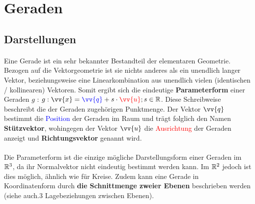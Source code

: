 \section{Geraden}

    \subsection{Darstellungen}

        \paragraph{} Eine Gerade ist ein sehr bekannter Bestandteil der elementaren Geometrie. Bezogen auf die Vektorgeometrie ist sie nichts anderes als ein
        unendlich langer Vektor, beziehungsweise eine Linearkombination aus unendlich vielen (identischen / kollinearen) Vektoren. Somit ergibt sich die
        eindeutige \textbf{Parameterform} einer Geraden $g$ : \quad$g:\vv{x}=\textcolor{blue}{\vv{q}}+s\cdot\textcolor{red}{\vv{u}};s\in\R$. Diese Schreibweise
        beschreibt die der Geraden zugehörigen Punktmenge. Der Vektor $\vv{q}$ bestimmt die \textcolor{blue}{Position} der Geraden im Raum und trägt folglich
        den Namen \textbf{Stützvektor}, wohingegen der Vektor $\vv{u}$ die \textcolor{red}{Ausrichtung} der Geraden anzeigt und \textbf{Richtungsvektor} genannt
        wird.
        \\
        \begin{Bemerkung}
            \paragraph{} Die Parameterform ist die einzige mögliche Darstellungsform einer Geraden im $\mathbb{R}^3$, da ihr Normalvektor nicht eindeutig bestimmt
            werden kann. Im $\mathbb{R}^2$ jedoch ist dies möglich, ähnlich wie für Kreise. Zudem kann eine Gerade in Koordinatenform durch \textbf{die
            Schnittmenge zweier Ebenen} beschrieben werden (siehe auch.3 Lagebeziehungen zwischen Ebenen\grqq).
        \end{Bemerkung}

